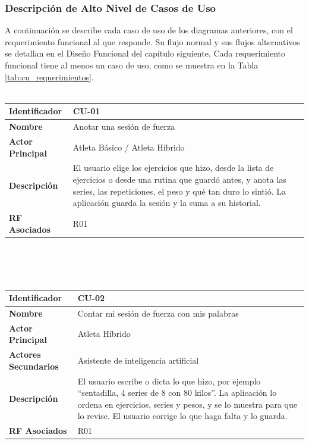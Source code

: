 \subsubsection{Descripción de Alto Nivel de Casos de Uso}
A continuación se describe cada caso de uso de los diagramas anteriores, con el requerimiento funcional al que responde. Su flujo normal y sus flujos alternativos se detallan en el Diseño Funcional del capítulo siguiente. Cada requerimiento funcional tiene al menos un caso de uso, como se muestra en la Tabla \ref{tab:cu_requerimientos}.
\\\\
\begin{tabular}{|p{3.5cm}|p{11.5cm}|}
    \hline
    \rowcolor[HTML]{EFEFEF}
    \textbf{Identificador} & \textbf{CU-01} \\ \hline
    \textbf{Nombre} & Anotar una sesión de fuerza \\ \hline
    \textbf{Actor Principal} & Atleta Básico / Atleta Híbrido \\ \hline
    \textbf{Descripción} & El usuario elige los ejercicios que hizo, desde la lista de ejercicios o desde una rutina que guardó antes, y anota las series, las repeticiones, el peso y qué tan duro lo sintió. La aplicación guarda la sesión y la suma a su historial. \\ \hline
    \textbf{RF Asociados} & R01 \\ \hline
\end{tabular}
\\\\\\
\begin{tabular}{|p{3.5cm}|p{11.5cm}|}
    \hline
    \rowcolor[HTML]{EFEFEF}
    \textbf{Identificador} & \textbf{CU-02} \\ \hline
    \textbf{Nombre} & Contar mi sesión de fuerza con mis palabras \\ \hline
    \textbf{Actor Principal} & Atleta Híbrido \\ \hline
    \textbf{Actores Secundarios} & Asistente de inteligencia artificial \\ \hline
    \textbf{Descripción} & El usuario escribe o dicta lo que hizo, por ejemplo ``sentadilla, 4 series de 8 con 80 kilos''. La aplicación lo ordena en ejercicios, series y pesos, y se lo muestra para que lo revise. El usuario corrige lo que haga falta y lo guarda. \\ \hline
    \textbf{RF Asociados} & R01 \\ \hline
\end{tabular}
